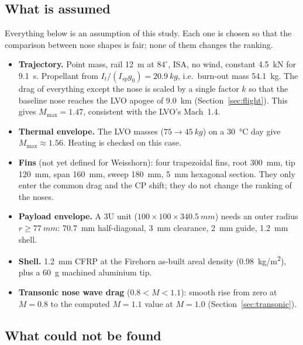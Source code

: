 \subsection{What is assumed}

Everything below is an assumption of this study. Each one is chosen so that the comparison
between nose shapes is fair; none of them changes the ranking.

\begin{itemize}[leftmargin=*,itemsep=2pt]
\item \textbf{Trajectory.} Point mass, rail \SI{12}{m} at $84^\circ$, ISA, no wind, constant
\SI{4.5}{kN} for \SI{9.1}{s}. Propellant from $I_t/(I_{sp}g_0) = \SI{20.9}{kg}$, i.e.\ burn-out
mass \SI{54.1}{kg}. The drag of everything except the nose is scaled by a single factor
$k$ so that the baseline nose reaches the LVO apogee of \SI{9.0}{km}
(Section~\ref{sec:flight}). This gives $M_{\max}=1.47$, consistent with the LVO's Mach~1.4.
\item \textbf{Thermal envelope.} The LVO masses ($75 \rightarrow \SI{45}{kg}$) on a
\SI{30}{\celsius} day give $M_{\max} \approx 1.56$. Heating is checked on this case.
\item \textbf{Fins} (not yet defined for Weisshorn): four trapezoidal fins, root \SI{300}{mm},
tip \SI{120}{mm}, span \SI{160}{mm}, sweep \SI{180}{mm}, \SI{5}{mm} hexagonal section. They only
enter the common drag and the CP shift; they do not change the ranking of the noses.
\item \textbf{Payload envelope.} A 3U unit ($100\times100\times\SI{340.5}{mm}$) needs an outer
radius $r \geq \SI{77}{mm}$: \SI{70.7}{mm} half-diagonal, \SI{3}{mm} clearance, \SI{2}{mm}
guide, \SI{1.2}{mm} shell.
\item \textbf{Shell.} \SI{1.2}{mm} CFRP at the Firehorn as-built areal density
(\SI{0.98}{kg/m^2}), plus a \SI{60}{g} machined aluminium tip.
\item \textbf{Transonic nose wave drag} ($0.8 < M < 1.1$): smooth rise from zero at $M = 0.8$
to the computed $M = 1.1$ value at $M = 1.0$ (Section~\ref{sec:transonic}).
\end{itemize}

\subsection{What could not be found}
\label{sec:flags}

